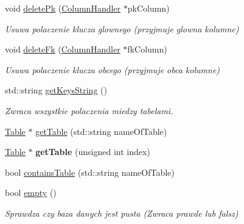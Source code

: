 \begin{DoxyCompactItemize}
\mbox{\label{class_database_ac153fb7c7534f137a359a98095f21043}} 
void \mbox{\hyperlink{class_database_ac153fb7c7534f137a359a98095f21043}{delete\+Pk}} (\mbox{\hyperlink{class_column_handler}{Column\+Handler}} $\ast$pk\+Column)
\begin{DoxyCompactList}\small\item\em Usuwa polaczenie klucza glownego (przyjmuje glowna kolumne) \end{DoxyCompactList}\item 
\mbox{\label{class_database_aa14d473d6896af6f530b1cd2875a22ca}} 
void \mbox{\hyperlink{class_database_aa14d473d6896af6f530b1cd2875a22ca}{delete\+Fk}} (\mbox{\hyperlink{class_column_handler}{Column\+Handler}} $\ast$fk\+Column)
\begin{DoxyCompactList}\small\item\em Usuwa polaczenie klucza obcego (przyjmuje obca kolumne) \end{DoxyCompactList}\item 
\mbox{\label{class_database_a177cf4f47f1621c9fdc6ef02c79f15d5}} 
std\+::string \mbox{\hyperlink{class_database_a177cf4f47f1621c9fdc6ef02c79f15d5}{get\+Keys\+String}} ()
\begin{DoxyCompactList}\small\item\em Zwraca wszystkie polaczenia miedzy tabelami. \end{DoxyCompactList}\item 
\mbox{\hyperlink{class_table}{Table}} $\ast$ \mbox{\hyperlink{class_database_a3e26371207ec61140b3853e606577d57}{get\+Table}} (std\+::string name\+Of\+Table)
\item 
\mbox{\label{class_database_aeddeeeb63684a663c7f6f46e406ae84e}} 
\mbox{\hyperlink{class_table}{Table}} $\ast$ {\bfseries get\+Table} (unsigned int index)
\item 
bool \mbox{\hyperlink{class_database_a8e8b77a7b47bc487e32f81bc34524e10}{contains\+Table}} (std\+::string name\+Of\+Table)
\item 
\mbox{\label{class_database_afefb0dc79154a0ec6d6ad80df11c6959}} 
bool \mbox{\hyperlink{class_database_afefb0dc79154a0ec6d6ad80df11c6959}{empty}} ()
\begin{DoxyCompactList}\small\item\em Sprawdza czy baza danych jest pusta (Zwraca prawde lub falsz) \end{DoxyCompactList}\item 

\end{DoxyCompactItemize}
